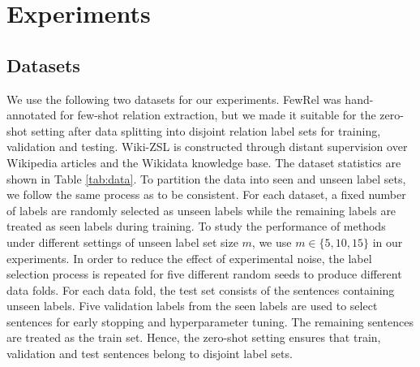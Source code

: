 \documentclass[11pt]{article}
\begin{document}
\section{Experiments}
\subsection{Datasets}
\label{sec:exp_data}


We use the following two datasets for our experiments.
FewRel \cite{han2018fewrel} was hand-annotated for few-shot relation extraction, but we made it suitable for the zero-shot setting after data splitting into disjoint relation label sets for training, validation and testing.
Wiki-ZSL \cite{chen2021zs} is constructed through distant supervision over Wikipedia articles and the Wikidata knowledge base.
The dataset statistics are shown in Table \ref{tab:data}.
To partition the data into seen and unseen label sets, we follow the same process as \citet{chen2021zs} to be consistent.
For each dataset, a fixed number of labels are randomly selected as unseen labels while the remaining labels are treated as seen labels during training.
To study the performance of methods under different settings of unseen label set size $m$, we use $m \in \{5, 10, 15\}$ in our experiments.
In order to reduce the effect of experimental noise, the label selection process is repeated for five different random seeds to produce different data folds.
For each data fold, the test set consists of the sentences containing unseen labels.
Five validation labels from the seen labels are used to select sentences for early stopping and hyperparameter tuning. 
The remaining sentences are treated as the train set.
Hence, the zero-shot setting ensures that train, validation and test sentences belong to disjoint label sets.

\begin{table}[!t]
    \centering
    \caption{Dataset statistics. ``Sentence Length'' refers to the average number of words in each sentence.} 
    \label{tab:data}
\end{table} 
\end{document}
